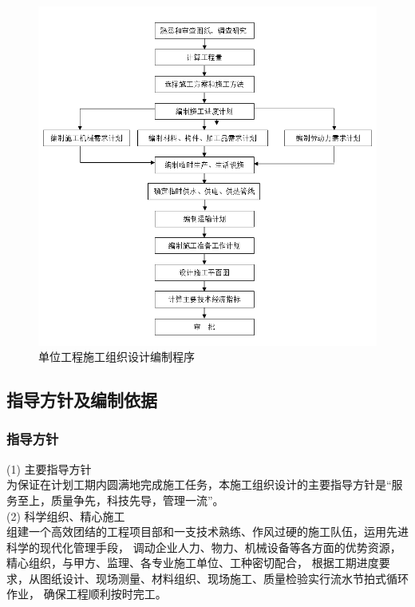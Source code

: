 \begin{figure}[thbp!]
    \centering
    \includegraphics[width=1.0\linewidth]{figure/c1f1.png}
    \caption{单位工程施工组织设计编制程序}
    \label{fig:c1f1}
\end{figure}

\subsection{指导方针及编制依据}

\subsubsection{指导方针}

(1) 主要指导方针\\

为保证在计划工期内圆满地完成施工任务，本施工组织设计的主要指导方针是“服务至上，质量争先，科技先导，管理一流”。\\

(2) 科学组织、精心施工\\

组建一个高效团结的工程项目部和一支技术熟练、作风过硬的施工队伍，运用先进科学的现代化管理手段，
调动企业人力、物力、机械设备等各方面的优势资源，精心组织，与甲方、监理、各专业施工单位、工种密切配合，
根据工期进度要求，从图纸设计、现场测量、材料组织、现场施工、质量检验实行流水节拍式循环作业，
确保工程顺利按时完工。\\

